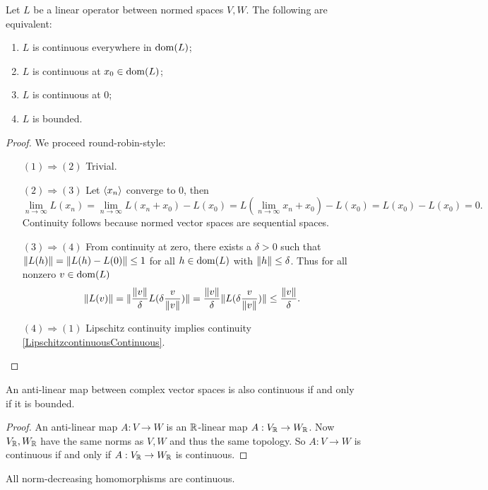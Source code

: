 \begin{theorem} \label{boundedLinearMaps}
Let $L$ be a linear operator between normed spaces $V,W$. The following are equivalent:
\begin{enumerate}
\item $L$ is continuous everywhere in $\operatorname{dom}(L)$;
\item $L$ is continuous at $x_0 \in \operatorname{dom}(L)$;
\item $L$ is continuous at $0$;
\item $L$ is bounded.
\end{enumerate}
\end{theorem}
\begin{proof}
We proceed round-robin-style:
\begin{itemize}[leftmargin=2cm]
\item[$\boxed{(1) \Rightarrow (2)}$] Trivial.
\item[$\boxed{(2) \Rightarrow (3)}$] Let $\left\langle x_n \right\rangle$ converge to $0$, then
\[ \lim_{n\to\infty}L(x_n) = \lim_{n\to\infty}L(x_n+x_0) - L(x_0) = L(\lim_{n\to\infty}x_n+x_0) - L(x_0) = L(x_0) - L(x_0) = 0. \]
Continuity follows because normed vector spaces are sequential spaces.
\item[$\boxed{(3) \Rightarrow (4)}$] From continuity at zero, there exists a $\delta>0$ such that $\lVert L(h)\rVert = \lVert L(h)-L(0)\rVert \leq 1$ for all $h\in \operatorname{dom}(L)$ with $\lVert h\rVert\leq \delta$. Thus for all nonzero $v\in \operatorname{dom}(L)$
\[ \lVert L(v)\rVert = \lVert\frac{\lVert v\rVert}{\delta}L(\delta \frac{v}{\lVert v\rVert})\rVert = \frac{\lVert v\rVert}{\delta}\lVert L(\delta \frac{v}{\lVert v\rVert})\rVert\leq \frac{\lVert v\rVert}{\delta}. \]
\item[$\boxed{(4) \Rightarrow (1)}$] Lipschitz continuity implies continuity \ref{LipschitzcontinuousContinuous}.
\end{itemize}
\end{proof}
\begin{corollary} \label{boundedAntiLinearMaps}
An anti-linear map between complex vector spaces is also continuous \textup{if and only if} it is bounded.
\end{corollary}
\begin{proof}
An anti-linear map $A:V\to W$ is an $\mathbb{R}$-linear map $A:V_{\mathbb{R}}\to W_{\mathbb{R}}$. Now $V_{\mathbb{R}}, W_{\mathbb{R}}$ have the same norms as $V,W$ and thus the same topology. So $A:V\to W$ is continuous if and only if $A:V_{\mathbb{R}}\to W_{\mathbb{R}}$ is continuous.
\end{proof}
\begin{corollary}
All norm-decreasing homomorphisms are continuous.
\end{corollary}


